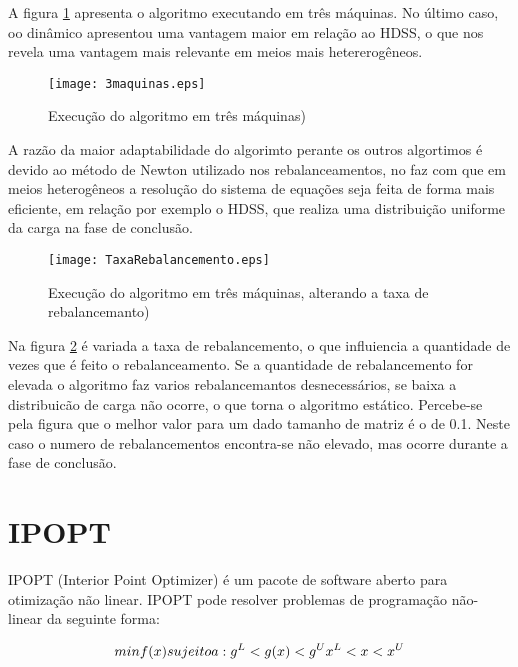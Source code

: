 A figura \ref{fig:3maquina} apresenta o algoritmo executando em três máquinas.  No último caso, oo dinâmico apresentou uma vantagem maior em relação ao HDSS, o que nos revela uma vantagem mais relevante em meios mais hetererogêneos. 

\begin{figure}[htb]
	\begin{center}
	\centering
			\texttt{[image: 3maquinas.eps]}
	\caption{Execução do algoritmo em três máquinas)}
	\label{fig:3maquina}
	\end{center}
\end{figure}

A razão da maior adaptabilidade do algorimto perante os outros algortimos é devido ao método de Newton utilizado nos rebalanceamentos, no faz com que em meios heterogêneos a resolução do sistema de equações seja feita de forma mais eficiente, em relação por exemplo o HDSS, que realiza uma distribuição uniforme da carga na fase de conclusão.



\begin{figure}[htb]
	\begin{center}
	\centering
			\texttt{[image: TaxaRebalancemento.eps]}
	\caption{Execução do algoritmo em três máquinas, alterando a taxa de rebalancemanto)}
	\label{fig:rebalanceamento}
	\end{center}
\end{figure}

Na figura \ref{fig:rebalanceamento} é variada a taxa de rebalancemento, o que influiencia a quantidade de vezes que é feito o rebalanceamento. Se a quantidade de rebalancemento for elevada o algoritmo faz varios rebalancemantos desnecessários, se baixa a distribuicão de carga não ocorre, o que torna o algoritmo estático. Percebe-se pela figura que o melhor valor para um dado tamanho de matriz é  o de 0.1. Neste caso o numero de rebalancementos encontra-se não elevado, mas ocorre durante a fase de conclusão.


\section{IPOPT}

IPOPT (Interior Point Optimizer) é um pacote de software aberto para otimização não linear. IPOPT pode resolver problemas de programação não-linear da seguinte forma:
	
\begin{equation}
 	min f(x)

	sujeito a: g^L < g(x) < g^U \\
			x^L< x < x^U
\end{equation}

